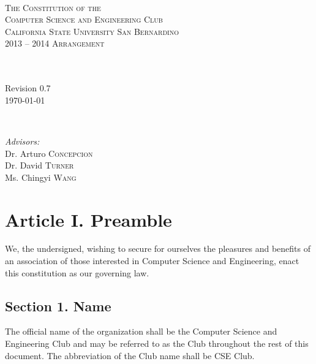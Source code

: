\documentclass{article}
\begin{document}
\begin{titlepage}
\begin{center}

~ \\[2cm]
\textsc{\LARGE The Constitution of the}\\[0.5cm]
\textsc{\LARGE Computer Science and Engineering Club}\\[1.0cm]
\textsc{\large California State University San Bernardino}\\[5cm]
\textsc{\Large 2013 -- 2014 Arrangement}\\[9.3cm]

\begin{minipage}{0.4\textwidth}
\begin{flushleft} \large
~\\
~\\
Revision 0.7 \\
\today
\end{flushleft}
\end{minipage}
~
\begin{minipage}{0.55\textwidth}
\begin{flushright} \large
\emph{Advisors:} \\
Dr. Arturo \textsc{Concepcion}\\
Dr. David \textsc{Turner}\\
Ms. Chingyi \textsc{Wang}
\end{flushright}
\end{minipage}
\end{center}
\end{titlepage}

\newpage
\tableofcontents

\newpage

\section{Article I. Preamble}
  We, the undersigned, wishing to secure for ourselves the pleasures and benefits of an association of those interested in Computer Science and Engineering, enact this constitution as our governing law.

  \subsection{Section 1. Name}
    The official name of the organization shall be the Computer Science and Engineering Club and may be referred to as the Club throughout the rest of this document. The abbreviation of the Club name shall be CSE Club.
\end{document}
